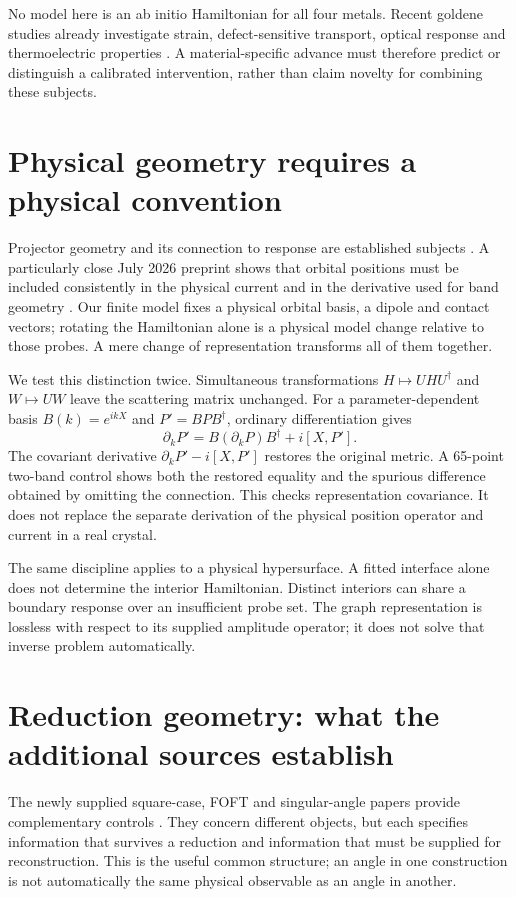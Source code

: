 \documentclass[11pt]{article}
\begin{document}
No model here is an ab initio Hamiltonian for all four metals. Recent goldene studies already investigate strain, defect-sensitive transport, optical response and thermoelectric properties \cite{goldene,multigoldene}. A material-specific advance must therefore predict or distinguish a calibrated intervention, rather than claim novelty for combining these subjects.

\section{Physical geometry requires a physical convention}
Projector geometry and its connection to response are established subjects \cite{projector,oh,embedding}. A particularly close July 2026 preprint shows that orbital positions must be included consistently in the physical current and in the derivative used for band geometry \cite{embedding}. Our finite model fixes a physical orbital basis, a dipole and contact vectors; rotating the Hamiltonian alone is a physical model change relative to those probes. A mere change of representation transforms all of them together.

We test this distinction twice. Simultaneous transformations $H\mapsto UHU^\dagger$ and $W\mapsto UW$ leave the scattering matrix unchanged. For a parameter-dependent basis $B(k)=e^{ikX}$ and $P'=BPB^\dagger$, ordinary differentiation gives
\begin{equation}
\partial_kP'=B(\partial_kP)B^\dagger+i[X,P'].
\end{equation}
The covariant derivative $\partial_kP'-i[X,P']$ restores the original metric. A 65-point two-band control shows both the restored equality and the spurious difference obtained by omitting the connection. This checks representation covariance. It does not replace the separate derivation of the physical position operator and current in a real crystal.

The same discipline applies to a physical hypersurface. A fitted interface alone does not determine the interior Hamiltonian. Distinct interiors can share a boundary response over an insufficient probe set. The graph representation is lossless with respect to its supplied amplitude operator; it does not solve that inverse problem automatically.

\section{Reduction geometry: what the additional sources establish}
The newly supplied square-case, FOFT and singular-angle papers provide complementary controls \cite{ladder,foft,angle}. They concern different objects, but each specifies information that survives a reduction and information that must be supplied for reconstruction. This is the useful common structure; an angle in one construction is not automatically the same physical observable as an angle in another.
\end{document}
